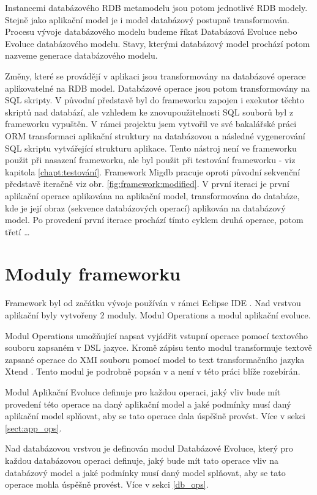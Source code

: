 \documentclass[11pt,twoside,a4paper]{book}
\begin{document}
Instancemi databázového RDB metamodelu jsou potom jednotlivé RDB modely. Stejně
jako aplikační model je i model databázový postupně transformován. Procesu
vývoje databázového modelu budeme říkat Databázová Evoluce nebo Evoluce
databázového modelu. Stavy, kterými databázový model prochází potom
nazveme generace databázového modelu.

Změny, které se provádějí v aplikaci jsou transformovány na databázové operace
aplikovatelné na RDB model. Databázové operace jsou potom transformovány na SQL
skripty. V původní představě byl do frameworku zapojen i exekutor těchto
skriptů nad databází, ale vzhledem ke znovupoužitelnosti SQL souborů byl z
frameworku vypuštěn.
\FloatBarrier
%
V rámci projektu jsem vytvořil ve své bakalářské práci \cite{Lukes} ORM
transformaci aplikační struktury na databázovou a následné vygenerování SQL
skriptu vytvářející strukturu aplikace. Tento nástroj není ve frameworku použit
při nasazení frameworku, ale byl použit při testování frameworku - viz
kapitola \ref{chapt:testování}. Framework Migdb pracuje oproti původní
sekvenční představě iteračně viz obr. \ref{fig:framework:modified}.
V první iteraci je první aplikační operace aplikována na aplikační model,
transformována do databáze, kde je její obraz (sekvence databázových operací)
aplikován na databázový model. Po provedení první iterace prochází tímto cyklem
druhá operace, potom třetí \ldots
%
\section{Moduly frameworku}
Framework byl od začátku vývoje používán v rámci Eclipse IDE
\cite{Eclipse_ide}. Nad vrstvou aplikační byly vytvořeny 2 moduly. Modul
Operations a modul aplikační evoluce.
 
Modul Operations umožňující napsat vyjádřit vstupní operace pomocí textového
souboru zapsaném v DSL jazyce. Kromě zápisu tento modul transformuje textově
zapsané operace do XMI \cite{XMI} souboru pomocí model to text transformačního
jazyka Xtend \cite{Xtend}. Tento modul je podrobně popsán v
\cite{Mazanec} a není v této práci blíže rozebírán.
 
Modul Aplikační Evoluce definuje pro každou operaci, jaký vliv bude mít
provedení této operace na daný aplikační model a jaké podmínky musí daný
aplikační model splňovat, aby se tato operace dala úspěšně provést. Více v
sekci \ref{sect:app_ops}.
 
Nad databázovou vrstvou je definován modul Databázové Evoluce, který pro
každou databázovou operaci definuje, jaký bude mít tato operace vliv na
databázový model a jaké podmínky musí daný model splňovat, aby se tato operace
mohla úspěšně provést. Více v sekci \ref{db_ops}.\\
 
\end{document}

